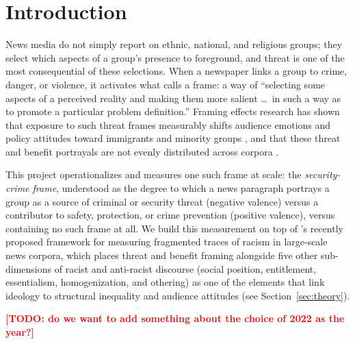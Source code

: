 \documentclass[a4paper,oneside,bibliography=totoc]{scrartcl}
\newcommand{\todo}[1]{\textcolor{red}{\textbf{[TODO: #1]}}}
\begin{document}
\section{Introduction}
\label{sec:intro}

News media do not simply report on ethnic, national, and religious groups; they select which aspects of a group's presence to foreground, and threat is one of the most consequential of these selections. When a newspaper links a group to crime, danger, or violence, it activates what \citet{entman1993} calls a frame: a way of ``selecting some aspects of a perceived reality and making them more salient \dots\ in such a way as to promote a particular problem definition.'' Framing effects research has shown that exposure to such threat frames measurably shifts audience emotions and policy attitudes toward immigrants and minority groups \citep{devreese2011,lecheler2015,guo2023}, and that these threat and benefit portrayals are not evenly distributed across corpora \citep{eberl2018}.

This project operationalizes and measures one such frame at scale: the \emph{security-crime frame}, understood as the degree to which a news paragraph portrays a group as a source of criminal or security threat (negative valence) versus a contributor to safety, protection, or crime prevention (positive valence), versus containing no such frame at all. We build this measurement on top of \citet{freudenthaler2025}'s recently proposed framework for measuring fragmented traces of racism in large-scale news corpora, which places threat and benefit framing alongside five other sub-dimensions of racist and anti-racist discourse (social position, entitlement, essentialism, homogenization, and othering) as one of the elements that link ideology to structural inequality and audience attitudes (see Section~\ref{sec:theory}).

\todo{do we want to add something about the choice of 2022 as the year?}
\end{document}
